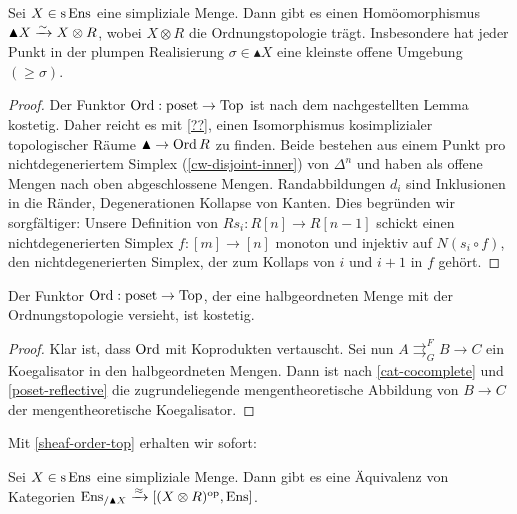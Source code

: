 \begin{prop}
  Sei $X \in \operatorname{s}\operatorname{Ens}$ eine simpliziale Menge. Dann gibt es einen
  Homöomorphismus $\blacktriangle X \xrightarrow[]{\sim} X \otimes R$, wobei $X
  \otimes R$ die Ordnungstopologie trägt. Insbesondere hat jeder Punkt
  in der plumpen Realisierung $\sigma \in \blacktriangle X$ eine
  kleinste offene Umgebung $(\geq \sigma)$.
\end{prop}
\begin{proof}
  
  Der Funktor $\operatorname{Ord}: \operatorname{poset} \to \operatorname{Top}$ ist nach dem nachgestellten
  Lemma kostetig. Daher reicht es mit \ref{??}, einen Isomorphismus
  kosimplizialer topologischer Räume $\blacktriangle \to \operatorname{Ord} R$ zu
  finden. Beide bestehen aus einem Punkt pro nichtdegeneriertem
  Simplex (\ref{cw-disjoint-inner}) von $\Delta^n$ und haben als
  offene Mengen nach oben abgeschlossene Mengen. Randabbildungen $d_i$
  sind Inklusionen in die Ränder, Degenerationen Kollapse von
  Kanten. Dies begründen wir sorgfältiger: Unsere Definition von
  $Rs_i: R[n] \to R[n-1]$ schickt einen nichtdegenerierten Simplex $f:
  [m] \to [n]$ monoton und injektiv auf $N(s_i \circ f)$, den
  nichtdegenerierten Simplex, der zum Kollaps von $i$ und $i+1$ in $f$
  gehört.
\end{proof}
\begin{lemma}
  Der Funktor $\operatorname{Ord}: \operatorname{poset} \to \operatorname{Top}$, der eine halbgeordneten Menge
  mit der Ordnungstopologie versieht, ist kostetig.
\end{lemma}
\begin{proof}
    Klar ist, dass $\operatorname{Ord}$ mit Koprodukten vertauscht. Sei nun $A
    \mathrel{\mathop{\rightrightarrows}^{F}_{G}} B \to C$ ein
    Koegalisator in den halbgeordneten Mengen. Dann ist nach
    \ref{cat-cocomplete} und \ref{poset-reflective} die
    zugrundeliegende mengentheoretische Abbildung von $B \to C$ der
    mengentheoretische Koegalisator.
\end{proof}


Mit \ref{sheaf-order-top} erhalten wir sofort:
\begin{prop}
  Sei $X \in \operatorname{s}\operatorname{Ens}$ eine simpliziale Menge. Dann gibt es eine
  Äquivalenz von Kategorien $\operatorname{Ens}_{/\blacktriangle X} \xrightarrow{\approx} [(X
    \otimes R)^\mathrm{op}, \operatorname{Ens}]$.
\end{prop}


